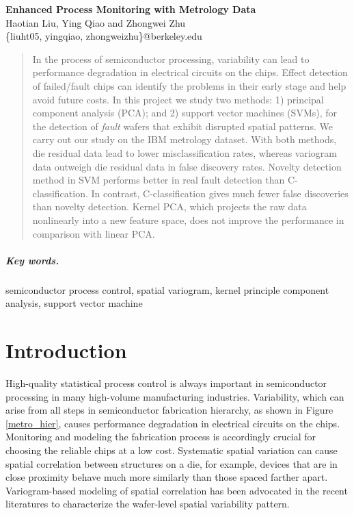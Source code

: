 \documentclass[english]{article}
\numberwithin{equation}{section}
\numberwithin{table}{section}
\numberwithin{figure}{section}
\begin{document}
\begin{center}
\textbf{\Large Enhanced Process Monitoring with Metrology Data} \\[6pt]
  Haotian Liu, Ying Qiao and Zhongwei Zhu \\[6pt]
  \{liuht05, yingqiao, zhongweizhu\}@berkeley.edu
\end{center}

\begin{abstract}
In the process of semiconductor processing, variability can lead to
performance degradation in electrical circuits on the chips. Effect
detection of failed/fault chips can identify the problems in their
early stage and help avoid future costs. In this project we study
two methods: 1) principal component analysis (PCA); and 2) support
vector machines (SVMs), for the detection of \emph{fault} wafers that
exhibit disrupted spatial patterns. We carry out our study on the
IBM metrology dataset. With both methods, die residual data lead to
lower misclassification rates, whereas variogram data outweigh die
residual data in false discovery rates. Novelty detection method in
SVM performs better in real fault detection than C-classification.
In contrast, C-classification gives much fewer false discoveries than
novelty detection. Kernel PCA, which projects the raw data nonlinearly
into a new feature space, does not improve the performance in comparison
with linear PCA.
\end{abstract}

\subparagraph{Key words.} semiconductor process control, spatial
variogram, kernel principle component analysis, support vector machine


\section{Introduction}

\hspace{12 pt}
High-quality statistical process control is always important in
semiconductor processing in many high-volume manufacturing
industries\cite{DAC09}. Variability, which can arise from all steps in
semiconductor fabrication hierarchy, as shown in Figure \ref{metro_hier},
causes performance degradation 
in electrical circuits on the chips. Monitoring and modeling the
fabrication process is accordingly crucial for choosing the reliable 
chips at a low cost. Systematic spatial variation can cause spatial
correlation between structures on a die, for example, devices that are
in close proximity behave much more similarly than those spaced
farther apart\cite{KedarPHD}. Variogram-based modeling of spatial
correlation has been advocated in the recent literatures to
characterize the wafer-level spatial variability pattern. 
\end{document}
